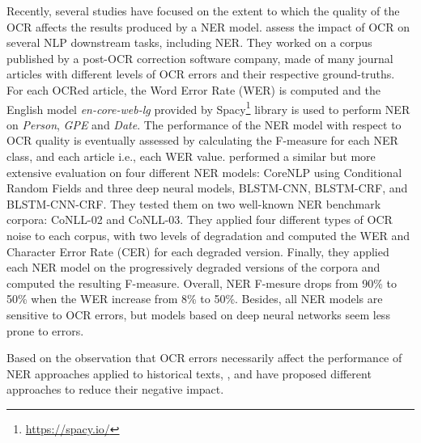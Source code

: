 Recently, several studies have focused on the extent to which the quality of the OCR affects the results produced by a NER model.\cite{van2020assessing} assess the impact of OCR on several NLP downstream tasks, including NER. They worked on a corpus published by a post-OCR correction software company, made of many journal articles with different levels of OCR errors and their respective ground-truths. For each OCRed article, the Word Error Rate (WER) is computed and the English model \textit{en-core-web-lg} provided by Spacy\footnote{\url{https://spacy.io/}} library is used to perform NER on \textit{Person}, \textit{GPE} and \textit{Date}. The performance of the NER model with respect to OCR quality is eventually assessed by calculating the F-measure for each NER class, and each article i.e., each WER value. \cite{hamdi2020assessing} performed a similar but more extensive evaluation on four different NER models: CoreNLP using Conditional Random Fields and three deep neural models, BLSTM-CNN, BLSTM-CRF, and BLSTM-CNN-CRF. They tested them on two well-known NER benchmark corpora: CoNLL-02 and CoNLL-03. They applied four different types of OCR noise to each corpus, with two levels of degradation and computed the WER and Character Error Rate (CER) for each degraded version. Finally, they applied each NER model on the progressively degraded versions of the corpora and computed the resulting F-measure. Overall, NER F-mesure drops from 90\% to 50\% when the WER increase from 8\% to 50\%. Besides, all NER models are sensitive to OCR errors, but models based on deep neural networks seem less prone to errors.

Based on the observation that OCR errors necessarily affect the performance of NER approaches applied to historical texts, \cite{huynh2020use}, \cite{martinek2019hybrid} and \cite{marz2021data} have proposed different approaches to reduce their negative impact.





